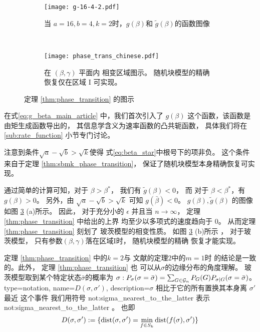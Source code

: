\begin{figure}[H]
	\begin{subfigure}{0.43\textwidth}
		\texttt{[image: g-16-4-2.pdf]}
		\caption{当 $a=16,b=4,k=2$时，$g(\beta)$和
		$\tilde{g}(\beta)$的函数图像}\label{fig:g}
	\end{subfigure}~
	\begin{subfigure}{0.55\textwidth}
		\texttt{[image: phase\_trans\_chinese.pdf]}
		\caption{
			在 $(\beta, \gamma)$ 平面内
			相变区域图示。
			随机块模型的精确
			恢复仅在区域 I 可实现。}\label{fig:pt}
	\end{subfigure}
	\caption{定理 \ref{thm:phase_transition} 
	的图示}
	\label{fig:phase_transition_theorem_illustration}
\end{figure}
\begin{remark}
	在式\eqref{eq:g_beta_main_article} 中，我们首次引入了
	$g(\beta)$ 这个函数，该函数是由矩生成函数导出的，
	其信息学含义为速率函数的凸共轭函数，
	具体我们将在 \ref{sub:rate_function} 小节专门讨论。
\end{remark}
注意到条件$\sqrt{a} - \sqrt{b} > \sqrt{k}$使得
式\eqref{eq:beta_star}中根号下的项非负。
这个条件来自于定理 \ref{thm:sbmk_phase_transition}，
保证了随机块模型本身精确恢复可实现。


通过简单的计算可知，对于 $\beta> \beta^*$，
我们有 $\tilde{g}(\beta) < 0$，
而 对于 $\beta < \beta^*$，有
$g(\beta)>0$。
另外，由 $\sqrt{a} - \sqrt{b} > \sqrt{k}$ 可知
$g(\bar{\beta}) < 0$。
$g(\beta), \tilde{g}(\beta)$ 的图像
如图 \ref{fig:phase_transition_theorem_illustration} (a)所示。
因此， 对于充分小的
$\epsilon$ 并且当 $n \to \infty$，
定理 \ref{thm:phase_transition} 中给出的上界
均至少以多项式的速度趋向于 $0$。
从而定理 \ref{thm:phase_transition} 刻划了
玻茨模型的相变性质。
如图 \ref{fig:phase_transition_theorem_illustration} (b)所示
， 对于玻茨模型， 只有参数$(\beta, \gamma)$落在区域I时，
随机块模型的精确
恢复才能实现。



定理 \ref{thm:phase_transition} 中的$k=2$与
文献的定理2中的$m=1$时
的结论是一致的。此外，
定理 \ref{thm:phase_transition} 也
可以从$\sigma$的边缘分布的角度理解。
玻茨模型取到某个特定状态$\bar{\sigma}$的概率为
 $\sigma: P_{\sigma}(\sigma =\bar{\sigma})
=\sum_{G \in \mathcal{G}_n}P_G(G)P_{\sigma |G}(\sigma=\bar{\sigma})$。
{
  type=notation,
  name={\ensuremath{D(\sigma, \sigma')}},
  description={$\sigma$ 相比于它的所有置换其本身离 $\sigma'$ 最近
  这个事件}
}
我们用符号 \gls{not:sigma_nearest_to_the_latter} 表示 \glsdesc{not:sigma_nearest_to_the_latter}
。
也即
\begin{equation}
	\label{eq:D_sigma_sigma_prime}
D(\sigma, \sigma') := \{  \operatorname{dist}(\sigma, \sigma')  = \min_{f \in S_k} \operatorname{dist}(f(\sigma), \sigma')  \}
\end{equation}

